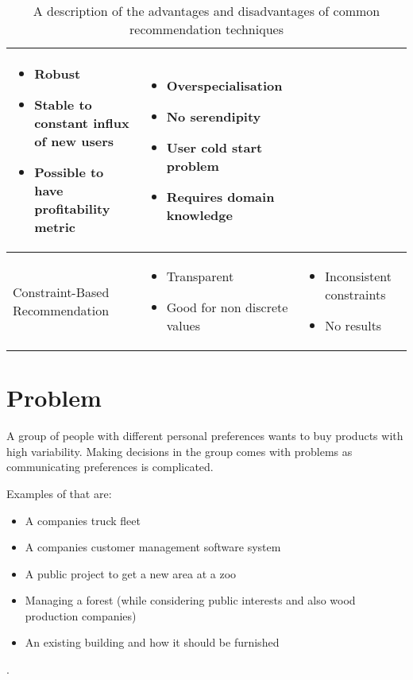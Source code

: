 \documentclass{article}
\begin{document}
\begin{table}
\begin{center}
\begin{tabularx}{\columnwidth}{X|X|X}
\begin{itemize}
                    \item Robust
                    \item Stable to constant influx of new users
                    \item Possible to have profitability metric
                \end{itemize}
            &   \begin{itemize}
                    \item Overspecialisation
                    \item No serendipity
                    \item User cold start problem
                    \item Requires domain knowledge
                \end{itemize} \\
            \hline
            Constraint-Based Recommendation 
            &   \begin{itemize}
                    \item Transparent
                    \item Good for non discrete values
                \end{itemize}
            &   \begin{itemize}
                    \item Inconsistent constraints
                    \item No results
                \end{itemize} \\ 
        \end{tabularx}
        \caption{A description of the advantages and disadvantages of common recommendation techniques}
        \label{tab:RecommenderComparison}
    \end{center}
\end{table}

\FloatBarrier

\section{Problem}
A group of people with different personal preferences wants to buy products with high variability. Making decisions in the group comes with problems as communicating preferences is complicated.

Examples of that are:
\begin{itemize}
    \item A companies truck fleet
    \item A companies customer management software system
    \item A public project to get a new area at a zoo
    \item Managing a forest (while considering public interests and also wood production companies)
    \item An existing building and how it should be furnished
\end{itemize}. 
\end{document}
